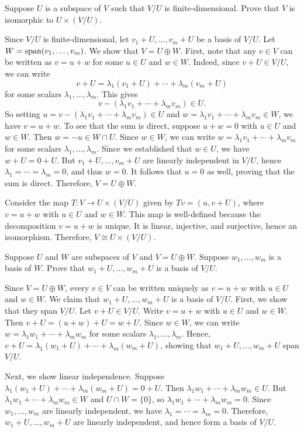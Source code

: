 \begin{exc}
\begin{exercise}
Suppose $U$ is a subspace of $V$ such that $V/U$ is finite-dimensional. Prove
that $V$ is isomorphic to $U\times(V/U)$.
\end{exercise}
\begin{solution}
Since $V/U$ is finite-dimensional, let $v_1+U,\dots,v_m+U$ be a basis of $V/U$.
Let $W=\operatorname{span}(v_1,\dots,v_m)$. We show that $V=U\oplus W$. First, note that any
$v\in V$ can be written as $v=u+w$ for some $u\in U$ and $w\in W$. Indeed, since
$v+U\in V/U$, we can write
\[ v+U = \lambda_1(v_1+U)+\cdots+\lambda_m(v_m+U) \]
for some scalars $\lambda_1,\dots,\lambda_m$. This gives
\[ v-(\lambda_1v_1+\cdots+\lambda_mv_m)\in U. \]
So setting $u=v-(\lambda_1v_1+\cdots+\lambda_mv_m)\in U$ and
$w=\lambda_1v_1+\cdots+\lambda_mv_m\in W$, we have $v=u+w$. To see that the sum
is direct, suppose $u+w=0$ with $u\in U$ and $w\in W$. Then $w=-u\in W\cap U$.
Since $w\in W$, we can write $w=\lambda_1v_1+\cdots+\lambda_mv_m$ for some
scalars $\lambda_1,\dots,\lambda_m$. Since we established that $w\in U$, we have
$w+U=0+U$. But $v_1+U,\dots,v_m+U$ are linearly independent in $V/U$, hence
$\lambda_1=\cdots=\lambda_m=0$, and thus $w=0$. It follows that $u=0$ as well,
proving that the sum is direct. Therefore, $V=U\oplus W$.

Consider the map $T\colon V\to U\times(V/U)$ given by $Tv=(u,v+U)$, where
$v=u+w$ with $u\in U$ and $w\in W$. This map is well-defined because the
decomposition $v=u+w$ is unique. It is linear, injective, and surjective, hence
an isomorphism. Therefore, $V\cong U\times(V/U)$.
\end{solution}

\begin{exercise}
Suppose $U$ and $W$ are subspaces of $V$ and $V=U\oplus W$. Suppose
$w_1,\dots,w_m$ is a basis of $W$. Prove that $w_1+U,\dots,w_m+U$ is a basis of
$V/U$.
\end{exercise}
\begin{solution}
Since $V=U\oplus W$, every $v\in V$ can be written uniquely as $v=u+w$ with
$u\in U$ and $w\in W$. We claim that $w_1+U,\dots,w_m+U$ is a basis of $V/U$.
First, we show that they span $V/U$. Let $v+U\in V/U$. Write $v=u+w$ with
$u\in U$ and $w\in W$. Then $v+U=(u+w)+U=w+U$. Since $w\in W$, we can write
$w=\lambda_1w_1+\cdots+\lambda_mw_m$ for some scalars
$\lambda_1,\dots,\lambda_m$. Hence,
$v+U=\lambda_1(w_1+U)+\cdots+\lambda_m(w_m+U)$, showing that
$w_1+U,\dots,w_m+U$ span $V/U$.

Next, we show linear independence. Suppose
$\lambda_1(w_1+U)+\cdots+\lambda_m(w_m+U)=0+U$. Then
$\lambda_1w_1+\cdots+\lambda_mw_m\in U$. But
$\lambda_1w_1+\cdots+\lambda_mw_m\in W$ and $U\cap W=\{0\}$, so
$\lambda_1w_1+\cdots+\lambda_mw_m=0$. Since $w_1,\dots,w_m$ are linearly
independent, we have $\lambda_1=\cdots=\lambda_m=0$. Therefore,
$w_1+U,\dots,w_m+U$ are linearly independent, and hence form a basis of $V/U$.
\end{solution}


\end{exc}
